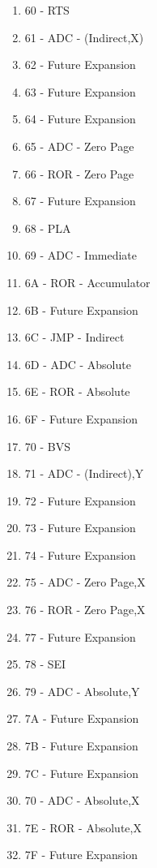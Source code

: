 \documentclass{article}
\begin{document}
\begin{multicols}{2}
\begin{enumerate}[label=\enumHex*,start=0]
    \item 60 - RTS
    \item 61 - ADC - (Indirect,X)
    \item 62 - Future Expansion
    \item 63 - Future Expansion
    \item 64 - Future Expansion
    \item 65 - ADC - Zero Page
    \item 66 - ROR - Zero Page
    \item 67 - Future Expansion
    \item 68 - PLA
    \item 69 - ADC - Immediate
    \item 6A - ROR - Accumulator
    \item 6B - Future Expansion
    \item 6C - JMP - Indirect
    \item 6D - ADC - Absolute
    \item 6E - ROR - Absolute
    \item 6F - Future Expansion
    \item 70 - BVS
    \item 71 - ADC - (Indirect),Y
    \item 72 - Future Expansion
    \item 73 - Future Expansion
    \item 74 - Future Expansion
    \item 75 - ADC - Zero Page,X
    \item 76 - ROR - Zero Page,X
    \item 77 - Future Expansion
    \item 78 - SEI
    \item 79 - ADC - Absolute,Y
    \item 7A - Future Expansion
    \item 7B - Future Expansion
    \item 7C - Future Expansion
    \item 70 - ADC - Absolute,X
    \item 7E - ROR - Absolute,X
    \item 7F - Future Expansion


\end{enumerate}
\end{multicols}
\end{document}
